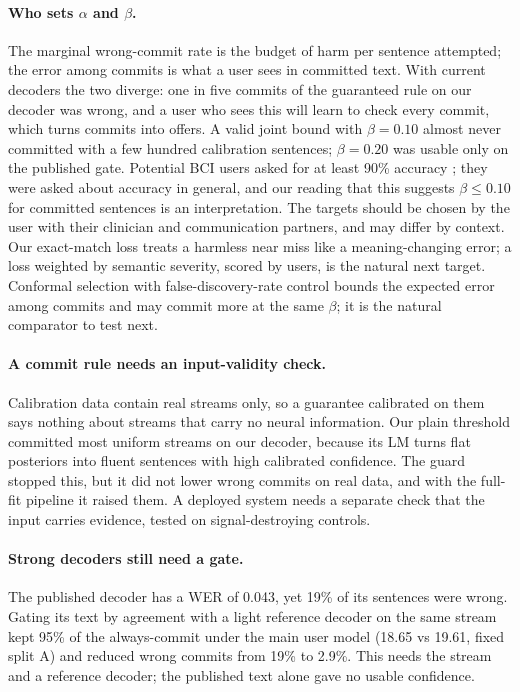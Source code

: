 \paragraph{Who sets $\alpha$ and $\beta$.} The marginal wrong-commit rate is the budget of harm per sentence attempted; the error among commits is what a user sees in committed text. With current decoders the two diverge: one in five commits of the guaranteed rule on our decoder was wrong, and a user who sees this will learn to check every commit, which turns commits into offers. A valid joint bound with $\beta = 0.10$ almost never committed with a few hundred calibration sentences; $\beta = 0.20$ was usable only on the published gate. Potential BCI users asked for at least 90\% accuracy \citep{huggins2011als,huggins2015sci}; they were asked about accuracy in general, and our reading that this suggests $\beta \le 0.10$ for committed sentences is an interpretation. The targets should be chosen by the user with their clinician and communication partners, and may differ by context. Our exact-match loss treats a harmless near miss like a meaning-changing error; a loss weighted by semantic severity, scored by users, is the natural next target. Conformal selection with false-discovery-rate control \citep{jin2023selection,gui2024alignment} bounds the expected error among commits and may commit more at the same $\beta$; it is the natural comparator to test next.

\paragraph{A commit rule needs an input-validity check.} Calibration data contain real streams only, so a guarantee calibrated on them says nothing about streams that carry no neural information. Our plain threshold committed most uniform streams on our decoder, because its LM turns flat posteriors into fluent sentences with high calibrated confidence. The guard stopped this, but it did not lower wrong commits on real data, and with the full-fit pipeline it raised them. A deployed system needs a separate check that the input carries evidence, tested on signal-destroying controls.

\paragraph{Strong decoders still need a gate.} The published decoder has a WER of 0.043, yet 19\% of its sentences were wrong. Gating its text by agreement with a light reference decoder on the same stream kept 95\% of the always-commit \ewpm{} under the main user model (18.65 vs 19.61, fixed split A) and reduced wrong commits from 19\% to 2.9\%. This needs the stream and a reference decoder; the published text alone gave no usable confidence.

